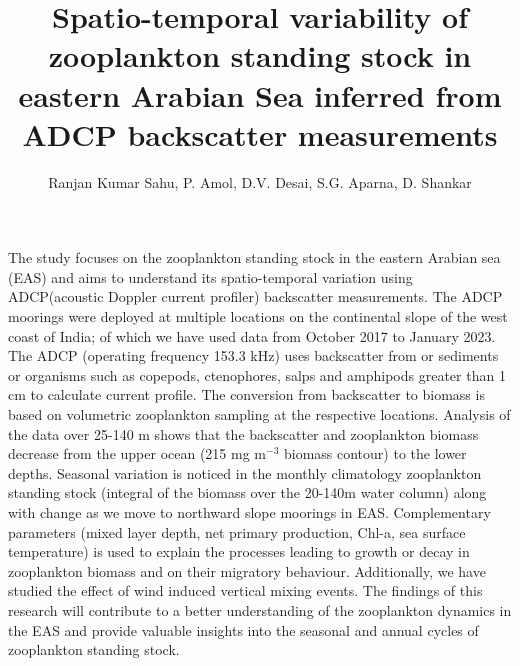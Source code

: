 \documentclass{article}
\title{Spatio-temporal variability of zooplankton standing stock in eastern Arabian Sea inferred from ADCP backscatter measurements }}
\author{Ranjan Kumar Sahu, P. Amol, D.V. Desai, S.G. Aparna, D. Shankar}
\begin{document}
		The study focuses on the zooplankton standing stock in the eastern Arabian sea (EAS) and aims to understand its spatio-temporal variation using ADCP(acoustic Doppler current profiler) backscatter measurements. The ADCP moorings were deployed at multiple locations on the continental slope of the west coast of India; of which we have used data from October 2017 to January 2023. The ADCP (operating frequency 153.3 kHz) uses backscatter from or sediments or organisms such as copepods, ctenophores, salps and amphipods greater than 1 cm to calculate current profile. The conversion from backscatter to biomass is based on volumetric zooplankton sampling at the respective locations. Analysis of the data over 25-140 m shows that the backscatter and zooplankton biomass decrease from the upper ocean (215 mg m$^{-3}$ biomass contour) to the lower depths. Seasonal variation is noticed in the monthly climatology zooplankton standing stock (integral of the biomass over the 20-140m water column) along with change as we move to northward slope moorings in EAS. Complementary parameters (mixed layer depth, net primary production, Chl-a, sea surface temperature) is used to explain the processes leading to growth or decay in zooplankton biomass and on their migratory behaviour. Additionally, we have studied the effect of wind induced vertical mixing events. The findings of this research will contribute to a better understanding of the zooplankton dynamics in the EAS and provide valuable insights into the seasonal and annual cycles of zooplankton standing stock.
		
		
\end{document}
